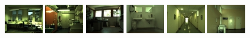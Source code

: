 \begin{figure}
\begin{center}
\includegraphics[width=0.15\textwidth]{figures/cold/Saarbruecken_RL.jpg}
\includegraphics[width=0.15\textwidth]{figures/cold/Saarbruecken_PA.jpg}
\includegraphics[width=0.15\textwidth]{figures/cold/Freiburg_1PO.jpg}
\includegraphics[width=0.15\textwidth]{figures/cold/Freiburg_TL.jpg}
\includegraphics[width=0.15\textwidth]{figures/cold/Ljubljana_CR.jpg}
\includegraphics[width=0.15\textwidth]{figures/cold/Ljubljana_PA.jpg}


\end{center}
\end{figure}
